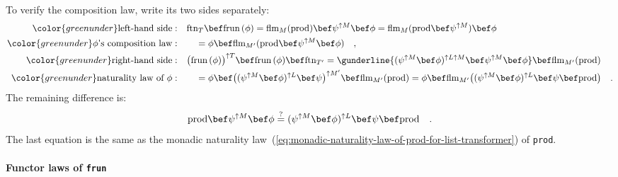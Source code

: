 To verify the composition law, write its two sides separately:
\begin{align*}
{\color{greenunder}\text{left-hand side}:}\quad & \text{ftn}_{T}\bef\text{frun}\,(\phi)=\text{flm}_{M}(\text{prod})\bef\psi^{\uparrow M}\bef\phi=\text{flm}_{M}(\text{prod}\bef\psi^{\uparrow M})\bef\phi\\
{\color{greenunder}\phi\text{\textsf{'}s composition law}:}\quad & \quad=\phi\bef\text{flm}_{M^{\prime}}(\text{prod}\bef\psi^{\uparrow M}\bef\phi)\quad,\\
{\color{greenunder}\text{right-hand side}:}\quad & \big(\text{frun}\,(\phi)\big)^{\uparrow T}\bef\text{frun}\,(\phi)\bef\text{ftn}_{T^{\prime}}=\gunderline{(\psi^{\uparrow M}\bef\phi)^{\uparrow L\uparrow M}\bef\psi^{\uparrow M}\bef\phi}\bef\text{flm}_{M^{\prime}}(\text{prod})\\
{\color{greenunder}\text{naturality law of }\phi:}\quad & \quad=\phi\bef\big((\psi^{\uparrow M}\bef\phi)^{\uparrow L}\bef\psi\big)^{\uparrow M^{\prime}}\bef\text{flm}_{M^{\prime}}(\text{prod})=\phi\bef\text{flm}_{M^{\prime}}\big((\psi^{\uparrow M}\bef\phi)^{\uparrow L}\bef\psi\bef\text{prod}\big)\quad.
\end{align*}
The remaining difference is:
\[
\text{prod}\bef\psi^{\uparrow M}\bef\phi\overset{?}{=}(\psi^{\uparrow M}\bef\phi)^{\uparrow L}\bef\psi\bef\text{prod}\quad.
\]
The last equation is the same as the monadic naturality law~(\ref{eq:monadic-naturality-law-of-prod-for-list-transformer})
of \lstinline!prod!.

\paragraph{Functor laws of \texttt{frun}}

